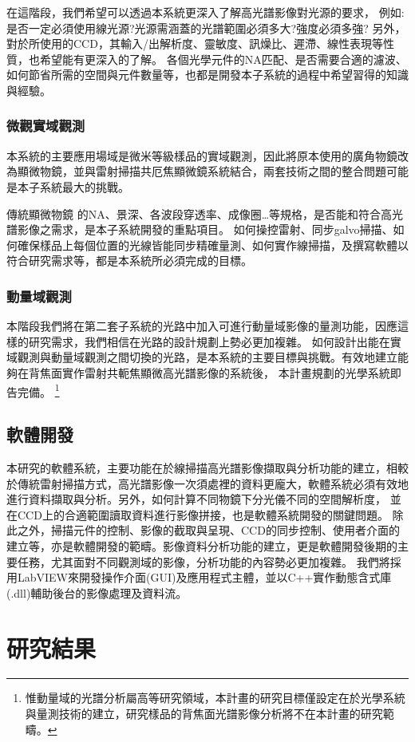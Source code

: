 \documentclass[12pt]{article}
\begin{document}
在這階段，我們希望可以透過本系統更深入了解高光譜影像對光源的要求，
例如: 是否一定必須使用線光源?光源需涵蓋的光譜範圍必須多大?強度必須多強?
另外，對於所使用的CCD，其輸入/出解析度、靈敏度、訊燥比、遲滯、線性表現等性質，也希望能有更深入的了解。
各個光學元件的NA匹配、是否需要合適的濾波、如何節省所需的空間與元件數量等，也都是開發本子系統的過程中希望習得的知識與經驗。
\subsubsection{微觀實域觀測} \label{microreal}
本系統的主要應用場域是微米等級樣品的實域觀測，因此將原本使用的廣角物鏡改為顯微物鏡，並與雷射掃描共厄焦顯微鏡系統結合，兩套技術之間的整合問題可能是本子系統最大的挑戰。

傳統顯微物鏡
的NA、景深、各波段穿透率、成像圈\ldots 等規格，是否能和符合高光譜影像之需求，是本子系統開發的重點項目。
如何操控雷射、同步galvo掃描、如何確保樣品上每個位置的光線皆能同步精確量測、如何實作線掃描，及撰寫軟體以符合研究需求等，都是本系統所必須完成的目標。
\subsubsection{動量域觀測} \label{momentum}
本階段我們將在第二套子系統的光路中加入可進行動量域影像的量測功能，因應這樣的研究需求，我們相信在光路的設計規劃上勢必更加複雜。
如何設計出能在實域觀測與動量域觀測之間切換的光路，是本系統的主要目標與挑戰。有效地建立能夠在背焦面實作雷射共軛焦顯微高光譜影像的系統後，
本計畫規劃的光學系統即告完備。
\footnote{惟動量域的光譜分析屬高等研究領域，本計畫的研究目標僅設定在於光學系統與量測技術的建立，研究樣品的背焦面光譜影像分析將不在本計畫的研究範疇。}

\subsection{軟體開發} \label{software}
本研究的軟體系統，主要功能在於線掃描高光譜影像擷取與分析功能的建立，相較於傳統雷射掃描方式，高光譜影像一次須處裡的資料更龐大，軟體系統必須有效地進行資料擷取與分析。另外，如何計算不同物鏡下分光儀不同的空間解析度，
並在CCD上的合適範圍讀取資料進行影像拼接，也是軟體系統開發的關鍵問題。
除此之外，掃描元件的控制、影像的截取與呈現、CCD的同步控制、使用者介面的建立等，亦是軟體開發的範疇。影像資料分析功能的建立，更是軟體開發後期的主要任務，尤其面對不同觀測域的影像，分析功能的內容勢必更加複雜。
我們將採用LabVIEW來開發操作介面(GUI)及應用程式主體，並以C++實作動態含式庫(.dll)輔助後台的影像處理及資料流。

    \section{研究結果}
\end{document}
